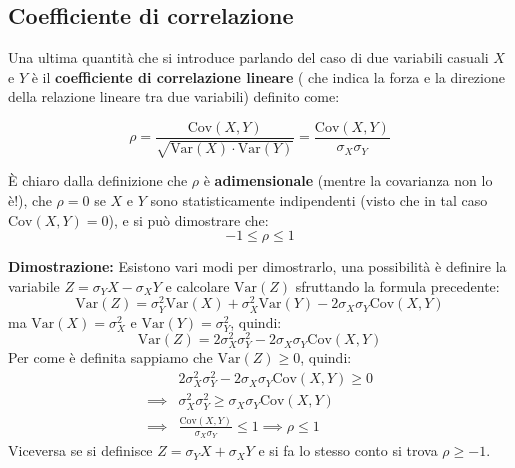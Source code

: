 \documentclass[openany,a4paper,12pt]{book}
\theoremstyle{remark}
\begin{document}
\subsection{Coefficiente di correlazione}

Una ultima quantità che si introduce parlando del caso di due variabili casuali $X$ e $Y$ è il \textbf{coefficiente di correlazione lineare} ( che indica  la forza e la direzione della relazione lineare tra due variabili) definito come:

\begin{equation}
\boxed{
    \rho = \frac{\text{Cov}(X,Y)}{\sqrt{\text{Var}(X) \cdot \text{Var}(Y)}} = \frac{\text{Cov}(X,Y)}{\sigma_X \sigma_Y}
}
\end{equation}


È chiaro dalla definizione che $\rho$ è \textbf{adimensionale} (mentre la covarianza non lo è!), che $\rho = 0$ se $X$ e $Y$ sono statisticamente indipendenti (visto che in tal caso $\text{Cov}(X,Y)=0$), e si può dimostrare che:
\begin{equation}
    -1 \le \rho \le 1
\end{equation}

\textbf{Dimostrazione:} Esistono vari modi per dimostrarlo, una possibilità è definire la variabile $Z = \sigma_Y X - \sigma_X Y$ e calcolare $\text{Var}(Z)$ sfruttando la formula precedente:
\begin{equation*}
    \text{Var}(Z) = \sigma_Y^2 \text{Var}(X) + \sigma_X^2 \text{Var}(Y) - 2\sigma_X \sigma_Y \text{Cov}(X,Y)
\end{equation*}
ma $\text{Var}(X) = \sigma_X^2$ e $\text{Var}(Y) = \sigma_Y^2$, quindi:
\begin{equation*}
    \text{Var}(Z) = 2\sigma_X^2 \sigma_Y^2 - 2\sigma_X \sigma_Y \text{Cov}(X,Y)
\end{equation*}
Per come è definita sappiamo che $\text{Var}(Z) \ge 0$, quindi:
\begin{align*}
    & 2\sigma_X^2 \sigma_Y^2 - 2\sigma_X \sigma_Y \text{Cov}(X,Y) \ge 0 \\
    \implies & \sigma_X^2 \sigma_Y^2 \ge \sigma_X \sigma_Y \text{Cov}(X,Y) \\
    \implies & \frac{\text{Cov}(X,Y)}{\sigma_X \sigma_Y} \le 1 \implies \rho \le 1
\end{align*}
Viceversa se si definisce $Z = \sigma_Y X + \sigma_X Y$ e si fa lo stesso conto si trova $\rho \ge -1$.
\end{document}
